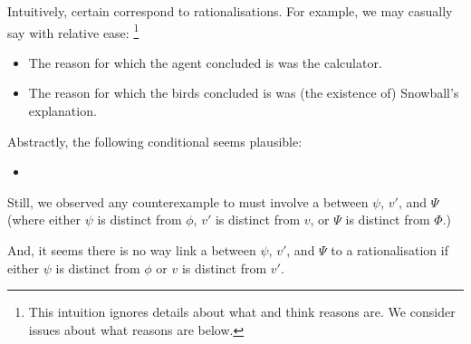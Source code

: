 \begin{note}
  Intuitively, certain  correspond to rationalisations.
  For example, we may casually say with relative ease:%
  \footnote{
    This intuition ignores details about what \citeauthor{Davidson:1963aa} and \citeauthor{Hieronymi:2011aa} think reasons are.
    We consider issues about what reasons are below.
  }

  \begin{itemize}
  \item
    The reason for which the agent concluded \propM{\gistCalcEq{}} is  was the calculator.
  \item
    The reason for which the birds concluded  is  was (the existence of) Snowball's explanation.
  \end{itemize}
  Abstractly, the following conditional seems plausible:
  \begin{itemize}
  \item
  \end{itemize}
  Still, we observed any counterexample to \issueInclusion{} must involve a \ros{} between \(\psi\), \(v'\), and \(\Psi\) (where either \(\psi\) is distinct from \(\phi\), \(v'\) is distinct from \(v\), or \(\Psi\) is distinct from \(\Phi\).)

  And, it seems there is no way link a \ros{} between \(\psi\), \(v'\), and \(\Psi\) to a rationalisation if either \(\psi\) is distinct from \(\phi\) or \(v\) is distinct from \(v'\).


\end{note}
